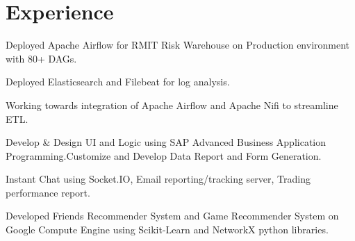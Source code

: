 \documentclass[]{Vishnu-Resume}
\begin{document}
\hfill
\begin{minipage}[t]{0.66\textwidth} 


\section{Experience}

\vspace{\topsep} %
\begin{tightemize}\item Deployed Apache Airflow for RMIT Risk Warehouse on Production environment with 80+ DAGs.
\item Deployed Elasticsearch and Filebeat for log analysis.
\item Working towards integration of Apache Airflow and Apache Nifi to streamline ETL.
\end{tightemize}
\sectionsep

\begin{tightemize}\item Develop & Design UI and Logic using SAP Advanced Business Application
Programming.Customize and Develop Data Report and Form Generation.
\end{tightemize}
\sectionsep

\begin{tightemize}\item Instant Chat using Socket.IO, Email reporting/tracking server, Trading performance report.
\end{tightemize}
\sectionsep

\begin{tightemize}\item Developed Friends Recommender System and Game Recommender System on
Google Compute Engine using Scikit-Learn and NetworkX python libraries.
\end{tightemize}
\sectionsep


\end{minipage}
\end{document}
